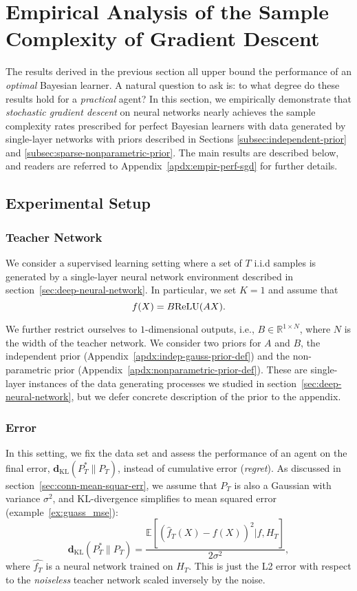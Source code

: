 \documentclass[twoside,11pt]{article}
\def\KL{\mathbf{d}_{\mathrm{KL}}}
\def\relu{{\rm ReLU}}
\def\E{\mathbb{E}}
\def\R{\mathbb{R}}
\begin{document}
\section{Empirical Analysis of the Sample Complexity of Gradient Descent}
The results derived in the previous section all upper bound the performance of an \emph{optimal} Bayesian learner. A natural question to ask is: to what degree do these results hold for a \emph{practical} agent? In this section, we empirically demonstrate that \emph{stochastic gradient descent} on neural networks nearly achieves the sample complexity rates prescribed for perfect Bayesian learners with data generated by single-layer networks with priors described in Sections \ref{subsec:independent-prior} and \ref{subsec:sparse-nonparametric-prior}.
The main results are described below, and readers are referred to Appendix~\ref{apdx:empir-perf-sgd} for further details.

\subsection{Experimental Setup}

\subsubsection{Teacher Network}
We consider a supervised learning setting where a set of $T$ i.i.d samples is generated by a single-layer neural network environment described in section~\ref{sec:deep-neural-network}.
In particular, we set $K=1$ and assume that
\[
  f(X) = B\relu(AX).
\]

We further restrict ourselves to $1$-dimensional outputs, i.e., $B\in\R^{1\times N}$, where $N$ is the width of the teacher network.
We consider two priors for $A$ and $B$, the independent prior (Appendix~\ref{apdx:indep-gauss-prior-def}) and the non-parametric prior (Appendix~\ref{apdx:nonparametric-prior-def}).
These are single-layer instances of the data generating processes we studied in section~\ref{sec:deep-neural-network}, but we defer concrete description of the prior to the appendix.

\subsubsection{Error}
In this setting, we fix the data set and assess the performance of an agent on the final error,
\(\KL(P^*_T \| P_T)\),
instead of cumulative error (\emph{regret}).
As discussed in section~\ref{sec:conn-mean-squar-err}, we assume that $P_T$ is also a Gaussian with variance $\sigma^2$, and KL-divergence simplifies to mean squared error (example~\ref{ex:guass_mse}):
\begin{equation}
  \label{eq:def-error-experiment}
  \KL(P^*_T \| P_T)
  = \frac{\E\left[\left(\hat{f}_T(X)-f(X)\right)^2 | f, H_{T} \right]}
   {2\sigma^2}
,
\end{equation}
where $\hat{f_T}$ is a neural network trained on $H_T$.
This is just the L2 error with respect to the \emph{noiseless} teacher network scaled inversely by the noise.
\end{document}
